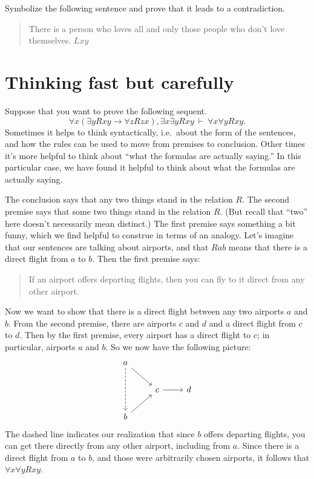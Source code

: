 \begin{exercise} Symbolize the following sentence and prove that it
  leads to a contradiction.
  \begin{quote} There is a person who loves all and only those people
    who don't love themselves. $Lxy$ \end{quote} \end{exercise}

\section{Thinking fast but carefully}

Suppose that you want to prove the following sequent.
\[ \forall x (\exists y Rxy\to \forall zRzx ), \exists x\exists yRxy
  \:\vdash\:\forall x\forall yRxy .\] Sometimes it helps to think
syntactically, i.e.\ about the form of the sentences, and how the
rules can be used to move from premises to conclusion.  Other times
it's more helpful to think about ``what the formulas are actually
saying.''  In this particular case, we have found it helpful to think
about what the formulas are actually saying.


The conclusion says that any two things stand in the relation $R$.
The second premise says that some two things stand in the relation
$R$.  (But recall that ``two'' here doesn't necessarily mean
distinct.)  The first premise says something a bit funny, which we
find helpful to construe in terms of an analogy.  Let's imagine that
our sentences are talking about airports, and that $Rab$ means that
there is a direct flight from $a$ to $b$.  Then the first premise
says:
\begin{quote} If an airport offers departing flights, then you can fly
  to it direct from any other airport.  \end{quote}
Now we want to show that there is a direct flight between any two
airports $a$ and $b$.  From the second premise, there are airports $c$
and $d$ and a direct flight from $c$ to $d$.  Then by the first premise, every airport has a direct flight to $c$; in particular,
airports $a$ and $b$.  So we now have the following picture:
\[ \begin{tikzcd}
    a \arrow[dashed]{dd} \arrow{dr} & \\
    & c \arrow{r} & d \\
    b \arrow{ur} \end{tikzcd} \] The dashed line indicates our
realization that since $b$ offers departing flights, you can get there
directly from any other airport, including from $a$.  Since there is a
direct flight from $a$ to $b$, and those were arbitrarily chosen
airports, it follows that $\forall x\forall yRxy$.

